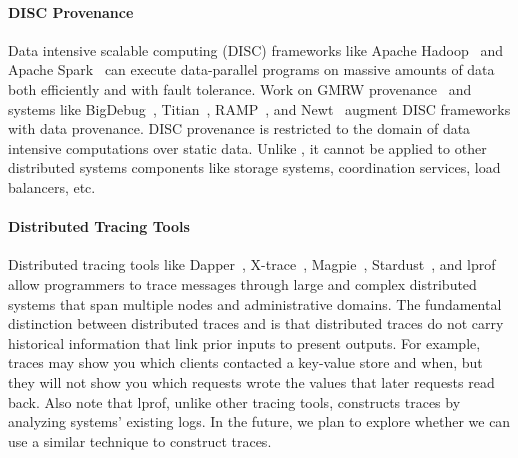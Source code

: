 \paragraph{DISC Provenance}
Data intensive scalable computing (DISC) frameworks like Apache
Hadoop~\cite{shvachko2010hadoop} and Apache Spark~\cite{zaharia2010spark} can
execute data-parallel programs on massive amounts of data both efficiently and
with fault tolerance. Work on GMRW provenance~\cite{ikeda2011provenance} and
systems like BigDebug~\cite{gulzar2016bigdebug},
Titian~\cite{interlandi2015titian}, RAMP~\cite{park2011ramp}, and
Newt~\cite{logothetis2013scalable} augment DISC frameworks with data
provenance. DISC provenance is restricted to the domain of data intensive
computations over static data. Unlike \watprovenance{}, it cannot be applied to
other distributed systems components like storage systems, coordination
services, load balancers, etc.

\paragraph{Distributed Tracing Tools}
Distributed tracing tools like Dapper~\cite{sigelman2010dapper},
X-trace~\cite{fonseca2007x}, Magpie~\cite{barham2003magpie},
Stardust~\cite{thereska2006stardust}, and lprof~\cite{zhao2014lprof} allow
programmers to trace messages through large and complex distributed systems
that span multiple nodes and administrative domains.
The fundamental distinction between distributed traces and \watprovenance{} is
that distributed traces do not carry historical information that link prior
inputs to present outputs. For example, traces may show you which clients
contacted a key-value store and when, but they will not show you which requests
wrote the values that later requests read back.
%
Also note that lprof, unlike other tracing tools, constructs traces by
analyzing systems' existing logs. In the future, we plan to explore whether we
can use a similar technique to construct traces.
